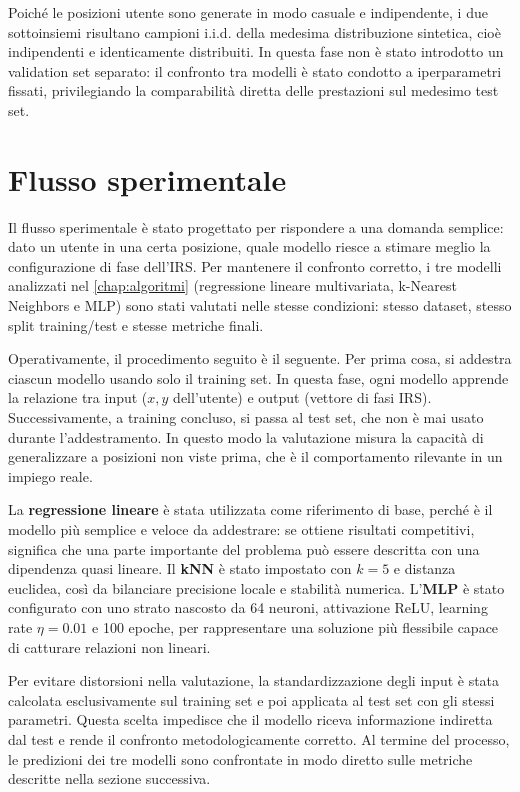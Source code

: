 \documentclass[12pt,a4paper]{report}
\begin{document}
Poiché le posizioni utente sono generate in modo casuale e
indipendente, i due sottoinsiemi risultano campioni i.i.d. della
medesima distribuzione sintetica, cioè indipendenti e identicamente
distribuiti. In questa fase non è stato
introdotto un validation set separato: il confronto tra modelli è
stato condotto a iperparametri fissati, privilegiando la
comparabilità diretta delle prestazioni sul medesimo test set.

\section{Flusso sperimentale}
Il flusso sperimentale è stato progettato per rispondere a una
domanda semplice: dato un utente in una certa posizione, quale
modello riesce a stimare meglio la configurazione di fase dell'IRS.
Per mantenere il confronto corretto, i tre modelli analizzati nel
\cref{chap:algoritmi} (regressione lineare multivariata, k-Nearest
Neighbors e MLP) sono stati valutati nelle stesse condizioni: stesso
dataset, stesso split training/test e stesse metriche finali.

Operativamente, il procedimento seguito è il seguente. Per prima
cosa, si addestra ciascun modello usando solo il training set. In
questa fase, ogni modello apprende la relazione tra input ($x,y$
dell'utente) e output (vettore di fasi IRS). Successivamente, a
training concluso, si passa al test set, che non è mai usato durante
l'addestramento. In questo modo la valutazione misura la capacità di
generalizzare a posizioni non viste prima, che è il comportamento
rilevante in un impiego reale.

La \textbf{regressione lineare} è stata utilizzata come riferimento
di base, perché è il modello più semplice e veloce da addestrare: se
ottiene risultati competitivi, significa che una parte importante del
problema può essere descritta con una dipendenza quasi lineare. Il
\textbf{kNN} è stato impostato con $k=5$ e distanza euclidea, così da
bilanciare precisione locale e stabilità numerica. L'\textbf{MLP} è
stato configurato con uno strato nascosto da 64 neuroni, attivazione
ReLU, learning rate $\eta=0.01$ e 100 epoche, per rappresentare una
soluzione più flessibile capace di catturare relazioni non lineari.

Per evitare distorsioni nella valutazione, la standardizzazione degli
input è stata calcolata esclusivamente sul training set e poi
applicata al test set con gli stessi parametri. Questa scelta
impedisce che il modello riceva informazione indiretta dal test e
rende il confronto metodologicamente corretto. Al termine del
processo, le predizioni dei tre modelli sono confrontate in modo
diretto sulle metriche descritte nella sezione successiva.
\end{document}
